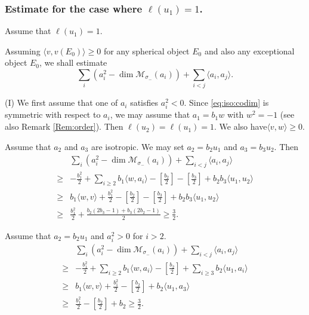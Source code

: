 \documentclass[leqno,11pt]{amsart}
\def\dim{\mathop{\mathrm{dim}}\nolimits}
\theoremstyle{definition}
\def\MM{\ensuremath{\mathcal M}}
\begin{document}
\subsubsection{Estimate for the case where $\ell(u_1)=1$. }  

Assume that $\ell(u_1)=1$.

Assuming $\langle v,v(E_0) \rangle \geq 0$
for any spherical object  $E_0$ and also any exceptional object 
$E_0$,
we shall estimate 
 \begin{equation}\label{eq:iso:codim}
\sum_i (a_i^2-\dim \MM_{\sigma_-}(a_i))+\sum_{i<j}\langle a_i,a_j \rangle.
\end{equation}

(I)
We first assume that one of $a_i$ satisfies $a_i^2<0$.
Since \eqref{eq:iso:codim} is symmetric
with respect to $a_i$,
we may assume that $a_1=b_1 w$ with $w^2=-1$
(see also Remark \ref{Rem:order}).
Then $\ell(u_2)=\ell(u_1)=1$.
We also have$\langle v,w \rangle \geq 0$.

Assume that $a_2$ and $a_3$ are isotropic.
We may set $a_2=b_2 u_1$ and $a_3=b_3 u_2$.
Then 
 \begin{equation}
\begin{split}
& \sum_i (a_i^2-\dim \MM_{\sigma_-}(a_i))+\sum_{i<j}\langle a_i,a_j \rangle\\
\geq & -\frac{b_1^2}{2}+\sum_{i \geq 2}b_1 \langle w,a_i \rangle
-[\tfrac{b_2}{2}]-[\tfrac{b_3}{2}]+b_2 b_3 \langle u_1,u_2 \rangle\\
\geq & b_1 \langle w,v \rangle+\frac{b_1^2}{2}
-[\tfrac{b_2}{2}]-[\tfrac{b_3}{2}]+b_2 b_3 \langle u_1,u_2 \rangle\\
\geq & \frac{b_1^2}{2}+\frac{b_2(2b_3-1)+b_3(2b_2-1)}{2} \geq \frac{3}{2}.
\end{split}
\end{equation}


Assume that $a_2=b_2 u_1$ and $a_i^2>0$ for $i>2$. 
 \begin{equation}
\begin{split}
& \sum_i (a_i^2-\dim \MM_{\sigma_-}(a_i))+\sum_{i<j}\langle a_i,a_j \rangle\\
\geq & -\frac{b_1^2}{2}+\sum_{i \geq 2}b_1 \langle w,a_i \rangle
-[\tfrac{b_2}{2}]+\sum_{i \geq 3} b_2 \langle u_1,a_i \rangle\\
\geq & b_1 \langle w,v \rangle+\frac{b_1^2}{2}
-[\tfrac{b_2}{2}]+b_2 \langle u_1,a_3 \rangle \\
\geq & \frac{b_1^2}{2} -[\tfrac{b_2}{2}]+b_2 \geq \frac{3}{2}.
\end{split}
\end{equation}
\end{document}
